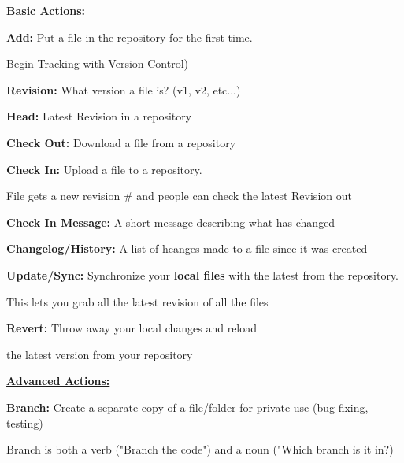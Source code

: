 \documentclass{article}
\begin{document}
\begin{flushedleft}
\textbf{Basic Actions:} \\
\par

\textbf{Add:} Put a file in the repository for the first time. \par
Begin Tracking with Version Control) \\
\par

\textbf{Revision:} What version a file is? (v1, v2, etc...) \\
\par

\textbf{Head:} Latest Revision in a repository \\
\par

\textbf{Check Out:} Download a file from a repository \\
\par

\textbf{Check In:} Upload a file to a repository. \par
File gets a new revision # and people can check the latest Revision out \\
\par

\textbf{Check In Message:}  A short message describing what has changed \\
\par

\textbf{Changelog/History:} A list of hcanges made to a file since it was created \\
\par

\textbf{Update/Sync:} Synchronize your \textbf{local files} with the latest from the repository. \par
This lets you grab all the latest revision of all the files \\
\par

\textbf{Revert:} Throw away your local changes and reload \par
the latest version from your repository \\
\par

\textbf{\underline{Advanced Actions:}} \\
\par

\textbf{Branch:} Create a separate copy of a file/folder for private use (bug fixing, testing) \par
Branch is both a verb ("Branch the code") and a noun ("Which branch is it in?) \\
\par


\end{flushedleft}
\end{document}
